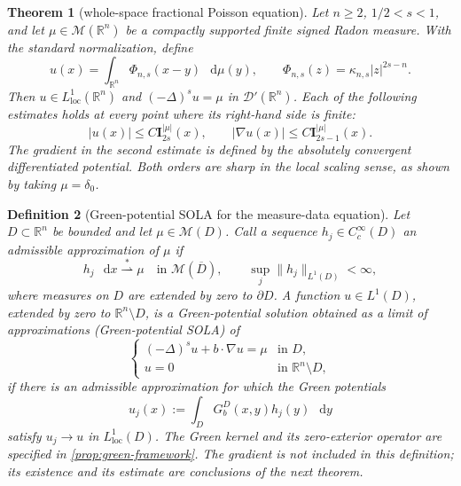\documentclass[10pt,a4paper]{amsart}
\numberwithin{equation}{section}
\newtheorem{theorem}{Theorem}[section]
\newtheorem{definition}[theorem]{Definition}
\newcommand{\R}{\mathbb R}
\newcommand{\M}{\mathcal M}
\newcommand{\I}{\mathbf I}
\newcommand{\differential}{\mathop{}\!\mathrm d}
\newcommand{\rev}[1]{#1}
\begin{document}
\begin{theorem}[whole-space fractional Poisson equation]
\label{thm:whole-space-potential}
Let $n\ge2$, $1/2<s<1$, and let $\mu\in\M(\R^n)$ be a compactly
supported finite signed Radon measure.  With the standard normalization,
define
\begin{equation}\label{eq:whole-space-solution}
 u(x)=\int_{\R^n}\Phi_{n,s}(x-y)\,\differential\mu(y),
 \qquad \Phi_{n,s}(z)=\kappa_{n,s}|z|^{2s-n}.
\end{equation}
Then $u\in L^1_{\mathrm{loc}}(\R^n)$ and $(-\Delta)^su=\mu$ in
$\mathcal D'(\R^n)$.  Each of the following estimates holds at every point
where its right-hand side is finite:
\begin{equation}\label{eq:whole-space-potential-estimates}
 |u(x)|\le C\I_{2s}^{|\mu|}(x),\qquad
 |\nabla u(x)|\le C\I_{2s-1}^{|\mu|}(x).
\end{equation}
The gradient in the second estimate is defined by the absolutely convergent
differentiated potential.  Both orders are sharp in the local scaling sense,
as shown by taking $\mu=\delta_0$.
\end{theorem}

\begin{definition}[\rev{Green-potential SOLA for the measure-data equation}]
\label{def:sola-measure}
Let $D\subset\R^n$ be bounded and let $\mu\in\M(D)$.  Call a sequence
$h_j\in C_c^\infty(D)$ an admissible approximation
of $\mu$ if
\[
 h_j\,\differential x\stackrel{*}{\rightharpoonup}\mu
 \quad\text{in }\M(\overline D),
 \qquad \sup_j\|h_j\|_{L^1(D)}<\infty,
\]
where measures on $D$ are extended by zero to $\partial D$.  A
function $u\in L^1(D)$, extended by zero to $\R^n\setminus D$, is a
\emph{Green-potential solution obtained as a limit of approximations}
(Green-potential SOLA) of
\begin{equation}\label{eq:measure-dirichlet-main}
 \begin{cases}
 (-\Delta)^su+b\cdot\nabla u=\mu&\text{in }D,\\
 u=0&\text{in }\R^n\setminus D,
 \end{cases}
\end{equation}
if there is an admissible approximation for which the Green potentials
\[
 u_j(x):=\int_DG_b^D(x,y)h_j(y)\,\differential y
\]
satisfy $u_j\to u$ in $L^1_{\mathrm{loc}}(D)$.  \rev{The Green kernel and
its zero-exterior operator are specified in
\cref{prop:green-framework}.}
The gradient is not included in this definition; its existence and its
estimate are conclusions of the next theorem.
\end{definition}
\end{document}
